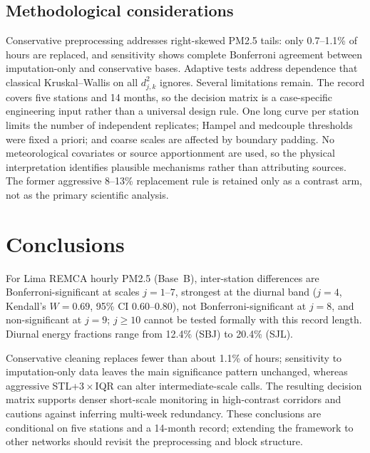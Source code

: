 \documentclass[12pt,letterpaper]{article}
\begin{document}
\subsection{Methodological considerations}

Conservative preprocessing addresses right-skewed PM2.5 tails: only 0.7--1.1\% of hours are replaced, and sensitivity shows complete Bonferroni agreement between imputation-only and conservative bases. Adaptive tests address dependence that classical Kruskal--Wallis on all $d_{j,k}^{2}$ ignores. Several limitations remain. The record covers five stations and 14 months, so the decision matrix is a case-specific engineering input rather than a universal design rule. One long curve per station limits the number of independent replicates; Hampel and medcouple thresholds were fixed a priori; and coarse scales are affected by boundary padding. No meteorological covariates or source apportionment are used, so the physical interpretation identifies plausible mechanisms rather than attributing sources. The former aggressive 8--13\% replacement rule is retained only as a contrast arm, not as the primary scientific analysis.


\section{Conclusions}
\label{sec:conclusions}

For Lima REMCA hourly PM2.5 (Base~B), inter-station differences are Bonferroni-significant at scales $j=1$--$7$, strongest at the diurnal band ($j=4$, Kendall's $W=0.69$, 95\% CI 0.60--0.80), not Bonferroni-significant at $j=8$, and non-significant at $j=9$; $j\ge10$ cannot be tested formally with this record length. Diurnal energy fractions range from 12.4\% (SBJ) to 20.4\% (SJL).

Conservative cleaning replaces fewer than about 1.1\% of hours; sensitivity to imputation-only data leaves the main significance pattern unchanged, whereas aggressive STL+$3\times$IQR can alter intermediate-scale calls. The resulting decision matrix supports denser short-scale monitoring in high-contrast corridors and cautions against inferring multi-week redundancy. These conclusions are conditional on five stations and a 14-month record; extending the framework to other networks should revisit the preprocessing and block structure.
\end{document}
